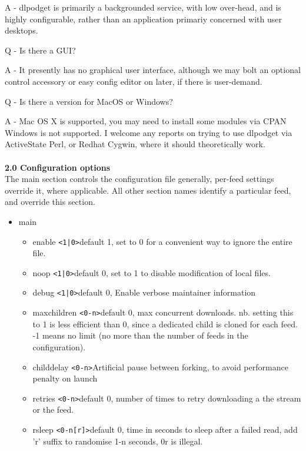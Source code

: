 \documentclass{article}
\begin{document}
A - dlpodget is primarily a backgrounded service, with low over-head, and is highly configurable,
rather than an application primariy concerned with user desktops.
\\
\par Q - Is there a GUI?

A - It presently has no graphical user interface, although we may bolt an optional control accessory
or easy config editor on later, if there is user-demand.
\\
\par Q - Is there a version for MacOS or Windows?

A - Mac OS X is supported, you may need to install some modules via CPAN
Windows is not supported.  I welcome any reports on trying to use dlpodget via ActiveState Perl,
or Redhat Cygwin, where it should theoretically work.
\\
\\
\textbf{2.0 Configuration options}
\\
The main section controls the configuration file generally, per-feed settings override it,
where applicable.  All other section names identify a particular feed, and override this section.
\begin{itemize} %
\item main %
\begin{itemize}
\item enable \verb=<1|0>=\newline default 1, set to 0 for a convenient way to ignore the entire file.
\\
\item noop \verb=<1|0>=\newline default 0, set to 1 to disable modification of local files.
\\
\item debug \verb=<1|0>=\newline default 0, Enable verbose maintainer information
\\
\item maxchildren \verb=<0-n>=\newline default 0, max concurrent downloads. nb. setting this to 1
is less efficient than 0, since a dedicated child is cloned for each feed.
-1 means no limit (no more than the number of feeds in the configuration).
\\
\item childdelay \verb=<0-n>=\newline Artificial pause between forking, to avoid performance penalty on launch
\\
\item retries \verb=<0-n>=\newline default 0, number of times to retry downloading a the stream or the feed.
\\
\item rsleep \verb=<0-n[r]>=\newline default 0, time in seconds to sleep after a failed read, add 'r' suffix
to randomise 1-n seconds, 0r is illegal.
\end{itemize} %
\end{itemize} %
\end{document}
